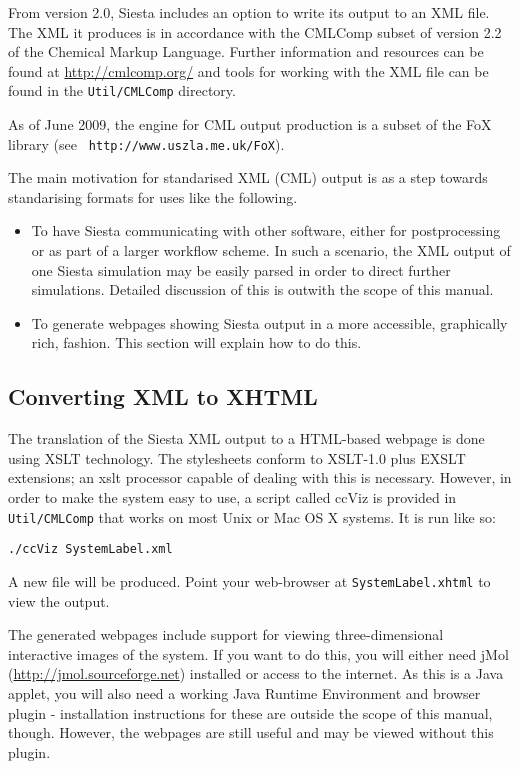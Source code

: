 \documentclass[11pt]{article}
\begin{document}
From version 2.0, {\sc Siesta} includes an option to write its output to an 
XML file. The XML it produces is in accordance with the CMLComp subset of 
version 2.2 of the Chemical Markup Language. Further information
and resources can be found at \url{http://cmlcomp.org/} and tools for working 
with the XML file can be found in the \texttt{Util/CMLComp} directory.

As of June 2009, the engine for CML output production is a subset of
the FoX library (see {\tt
  http://www.uszla.me.uk/FoX}).

The main motivation for standarised XML (CML) output is as a step
towards standarising formats for uses like the following.

\begin{itemize}

\item To have {\sc Siesta} communicating with other software, either
for postprocessing or as part of a larger workflow scheme. In such a
scenario, the XML output of one {\sc Siesta} simulation may be easily parsed
in order to direct further simulations. Detailed discussion of this is
outwith the scope of this manual.

\item To generate webpages showing {\sc Siesta} output in a more accessible,
graphically rich, fashion. This section will explain how to do this.

\end{itemize}

\subsection{Converting XML to XHTML}

The translation of the {\sc Siesta} XML output to a HTML-based webpage is
done using XSLT technology. The stylesheets conform to XSLT-1.0 plus
EXSLT extensions; an xslt processor capable of dealing with this is
necessary. However, in order to make the system easy to use, a script
called ccViz is provided in \texttt{Util/CMLComp} that works on most Unix or 
Mac OS X systems. It is run like so:

\texttt{./ccViz SystemLabel.xml}

A new file will be produced. Point your web-browser at \texttt{SystemLabel.xhtml}
to view the output.

The generated webpages include support for viewing three-dimensional
interactive images of the system. If you want to do this, you will
either need jMol (\url{http://jmol.sourceforge.net}) installed or access
to the internet. As this
is a Java applet, you will also need a working Java Runtime
Environment and browser plugin - installation instructions for these
are outside the scope of this manual, though. However, the webpages
are still useful and may be viewed without this plugin.
\end{document}

